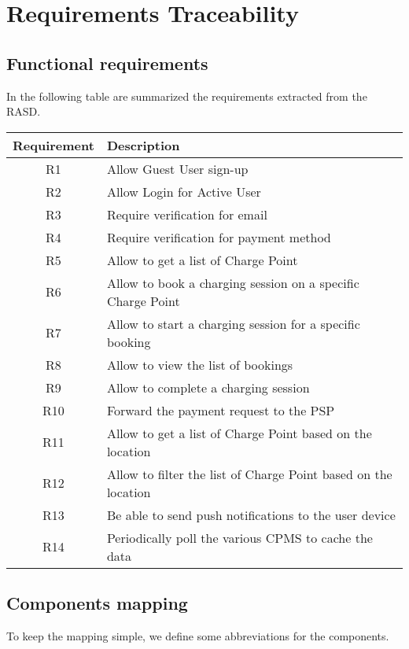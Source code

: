 \chapter{Requirements Traceability}
\section{Functional requirements}
In the following table are summarized the requirements extracted from the RASD.\\

\begin{tabular}{|c|l|}
	\hline
	\bf{Requirement} & \bf{Description} \\
	\hline
	\hline
	R1 & Allow Guest User sign-up\\
	\hline
	R2 & Allow Login for Active User\\
	\hline
	R3 & Require verification for email\\
	\hline
	R4 & Require verification for payment method\\
	\hline
	R5 & Allow to get a list of Charge Point\\
	\hline
	R6 & Allow to book a charging session on a specific Charge Point\\
	\hline
	R7 & Allow to start a charging session for a specific booking\\
	\hline
	R8 & Allow to view the list of bookings\\
	\hline
	R9 & Allow to complete a charging session\\
	\hline
	R10 & Forward the payment request to the PSP\\
	\hline
	R11 & Allow to get a list of Charge Point based on the location\\
	\hline
	R12 & Allow to filter the list of Charge Point based on the location\\
	\hline
	R13 & Be able to send push notifications to the user device\\
	\hline
	R14 & Periodically poll the various CPMS to cache the data\\
	
	\hline
\end{tabular}

\section{Components mapping}
To keep the mapping simple, we define some abbreviations for the components.\\

